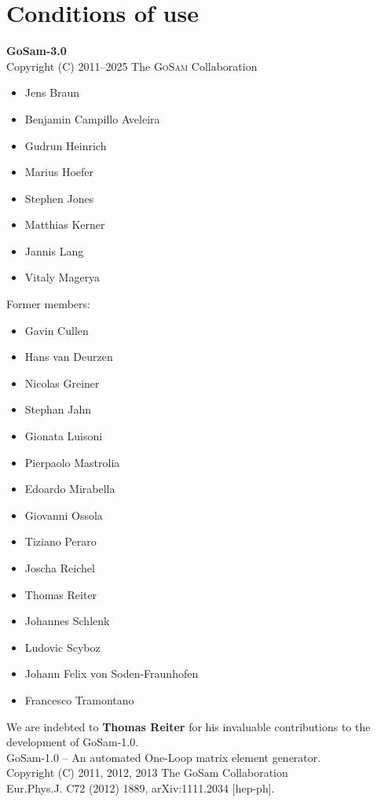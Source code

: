 \documentclass[11pt,a4paper]{refrep}
\newcommand{\gosam}{\textsc{GoSam}\xspace}
\begin{document}
\chapter*{Conditions of use}
    
    {\bf GoSam-3.0}  \\
    Copyright (C) 2011--2025  The \gosam Collaboration
   \begin{itemize}         
      \setlength\itemsep{-0.5em}
      \item Jens Braun
      \item Benjamin Campillo Aveleira      
      \item Gudrun Heinrich                  
      \item Marius Hoefer
      \item Stephen Jones
      \item Matthias Kerner
      \item Jannis Lang
      \item Vitaly Magerya

   \end{itemize}

    Former members:
    \begin{itemize}
      \setlength\itemsep{-0.5em}
      \item Gavin Cullen
      \item Hans van Deurzen
      \item Nicolas Greiner
      \item Stephan Jahn
      \item Gionata Luisoni
      \item Pierpaolo Mastrolia
      \item Edoardo Mirabella
      \item Giovanni Ossola
		\item Tiziano Peraro
      \item Joscha Reichel
		\item Thomas Reiter
		\item Johannes Schlenk
		\item Ludovic Scyboz
		\item Johann Felix von Soden-Fraunhofen
      \item Francesco Tramontano
    \end{itemize}
   
    We are indebted to {\bf Thomas Reiter} for his invaluable contributions 
    to the development of GoSam-1.0.\\
        GoSam-1.0 -- An automated One-Loop matrix element generator.\\
    Copyright (C) 2011, 2012, 2013  The GoSam Collaboration\\
    Eur.Phys.J. C72 (2012) 1889, arXiv:1111.2034 [hep-ph].
\end{document}
